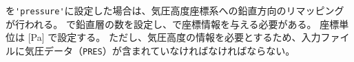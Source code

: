 を\verb|'pressure'|に設定した場合は、気圧高度座標系への鉛直方向のリマッピングが行われる。
で鉛直層の数を設定し、で座標情報を与える必要がある。
座標単位は [Pa] で設定する。
ただし、気圧高度の情報を必要とするため、入力ファイルに気圧データ（\verb|PRES|）が含まれていなければなければならない。
